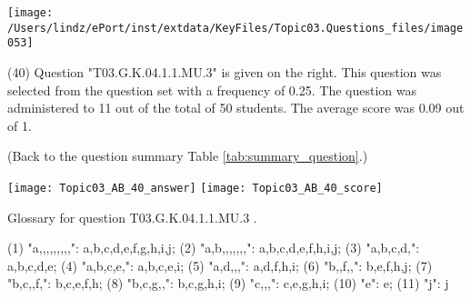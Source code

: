 \documentclass[12pt,english,nohyper]{tufte-handout}\usepackage[]{graphicx}\usepackage[]{color}
\begin{document}
\vspace{5cm}\begin{marginfigure}\texttt{[image: /Users/lindz/ePort/inst/extdata/KeyFiles/Topic03.Questions\_files/image053]}\end{marginfigure}\vspace{-5cm} (40) Question "T03.G.K.04.1.1.MU.3" is given on the right. This question was selected from the question set with a frequency of 0.25. The question was administered to 11 out of the total of 50 students. The average score was 0.09 out of 1.

 (Back to the question summary Table \ref{tab:summary_question}.)

\begin{center} \texttt{[image: Topic03\_AB\_40\_answer]} \texttt{[image: Topic03\_AB\_40\_score]} \end{center} 

Glossary for question T03.G.K.04.1.1.MU.3 .

(1) "a,,,,,,,,,": a,b,c,d,e,f,g,h,i,j; (2) "a,b,,,,,,,": a,b,c,d,e,f,h,i,j; (3) "a,b,c,d,": a,b,c,d,e; (4) "a,b,c,e,": a,b,c,e,i; (5) "a,d,,,": a,d,f,h,i; (6) "b,,f,,": b,e,f,h,j; (7) "b,c,,f,": b,c,e,f,h; (8) "b,c,g,,": b,c,g,h,i; (9) "c,,,": c,e,g,h,i; (10) "e": e; (11) "j": j
\end{document}
